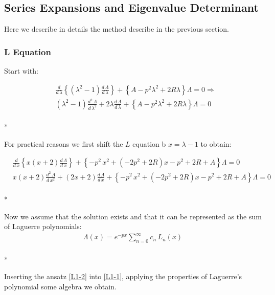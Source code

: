 \subsection{Series Expansions and Eigenvalue Determinant}

Here we describe in details the method describe in the previous section.

\subsubsection{L  Equation}

Start with:

\begin{equation}
\begin{split}
& \frac{d}{d\,\lambda}\left\{\left(\lambda^2-1\right)\frac{d\,\Lambda}{d\,\lambda}\right\} +
\left\{ A - p^2\lambda^2 + 2R\lambda  \right\}\Lambda = 0 \Rightarrow \\
& \left(\lambda^2-1\right)\frac{d^2\,\Lambda}{d\,\lambda^2} + 2\lambda \frac{d\,\Lambda}{d\,\lambda} + \left\{ A - p^2\lambda^2 + 2R\lambda  \right\}\Lambda = 0 
\end{split}
\end{equation}\\*

For practical reasons we first shift the $ L $ equation b $ x = \lambda - 1 $ to obtain:

\begin{equation}\label{L1-1}
\begin{split}
& \frac{d}{d\,x}\left\{x(x+2)\frac{d\,\Lambda}{d\,x} \right\} + \left\{ - p^2\,x^2 + (-2p^2 + 2R) x  -p^2 + 2R + A \right\}\Lambda = 0 \\[.8em]
& x(x+2)\frac{d^2\,\Lambda}{d\,x^2} + (2x+2)\frac{d\,\Lambda}{d\,x} +  \left\{ - p^2\,x^2 + (-2p^2 + 2R) x  -p^2 + 2R + A \right\}\Lambda = 0
\end{split}
\end{equation}\\*

Now we assume that  the solution exists and that it can be represented as the sum of Laguerre polynomials:
\begin{equation}\label{L1-2}
\begin{split}
\Lambda(x) = e^{-px}\sum_{n=0}^{\infty}{c_n\,L_n(x)}
\end{split}
\end{equation}\\*

Inserting the ansatz \eqref{L1-2} into \eqref{L1-1}, applying the properties of Laguerre's polynomial some algebra we obtain. 

